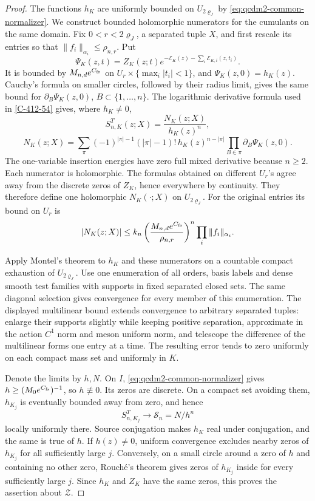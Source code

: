 \documentclass[11pt,letterpaper,reqno]{amsart}
\theoremstyle{definition}
\theoremstyle{remark}
\begin{document}
\begin{proof}
The functions \(h_K\) are uniformly bounded on \(U_{2\varrho_J}\)
by \eqref{eq:qcdm2-common-normalizer}. We construct bounded
holomorphic numerators for the cumulants on the same domain.
Fix \(0<r<2\varrho_J\), a separated tuple \(X\), and first
rescale its entries so that
\(\|f_i\|_{\alpha_i}\le\rho_{n,r}\).
Put
\[
 \Psi_K(z,t)=Z_K(z;t)
       e^{-\mathcal E_K(z)-\sum_i\mathcal E_{K,i}(z,t_i)}.
\]
It is bounded by \(M_{n,d}e^{C_{\rm fs}}\) on
\(U_r\times\{\max_i|t_i|<1\}\), and
\(\Psi_K(z,0)=h_K(z)\).
Cauchy's formula on smaller circles, followed by their radius
limit, gives the same bound for
\(\partial_B\Psi_K(z,0)\), \(B\subset\{1,\ldots,n\}\).
The logarithmic derivative formula used in
\cref{C-412-54} gives, where \(h_K\ne0\),
\[
 S^T_{n,K}(z;X)=\frac{N_K(z;X)}{h_K(z)^n},
\]
\[
 N_K(z;X)=
 \sum_\pi(-1)^{|\pi|-1}(|\pi|-1)!\,
 h_K(z)^{n-|\pi|}
             \prod_{B\in\pi}\partial_B\Psi_K(z,0).
\]
The one-variable insertion energies have zero full mixed
derivative because \(n\ge2\).
Each numerator is holomorphic. The formulas obtained on
different \(U_r\)'s agree away from the discrete zeros of
\(Z_K\), hence everywhere by continuity. They therefore
define one holomorphic \(N_K(\cdot;X)\) on \(U_{2\varrho_J}\).
For the original entries its bound on \(U_r\) is
\[
 |N_K(z;X)|\le
 k_n\left(\frac{M_{n,d}e^{C_{\rm fs}}}{\rho_{n,r}}\right)^n
                     \prod_i\|f_i\|_{\alpha_i}.
\]

Apply Montel's theorem to \(h_K\) and these numerators on a
countable compact exhaustion of \(U_{2\varrho_J}\).
Use one enumeration of all orders, basis labels and dense
smooth test families with supports in fixed separated closed
sets. The same diagonal selection gives convergence for
every member of this enumeration. The displayed multilinear
bound extends convergence to arbitrary separated tuples:
enlarge their supports slightly while keeping positive
separation, approximate in the action \(C^1\) norm and meson
uniform norm, and telescope the difference of the multilinear
forms one entry at a time. The resulting error tends to zero
uniformly on each compact mass set and uniformly in \(K\).

Denote the limits by \(h,N\).
On \(I\), \eqref{eq:qcdm2-common-normalizer} gives
\(h\ge(M_0e^{C_{\rm fs}})^{-1}\), so \(h\not\equiv0\).
Its zeros are discrete. On a compact set avoiding them,
\(h_{K_j}\) is eventually bounded away from zero, and hence
\[
 S^T_{n,K_j}\longrightarrow \mathcal S_n=N/h^n
\]
locally uniformly there. Source conjugation makes \(h_K\)
real under conjugation, and the same is true of \(h\).
If \(h(z)\ne0\), uniform convergence excludes nearby zeros
of \(h_{K_j}\) for all sufficiently large \(j\).
Conversely, on a small circle around a zero of \(h\) and
containing no other zero, Rouch\'e's theorem gives zeros of
\(h_{K_j}\) inside for every sufficiently large \(j\).
Since \(h_K\) and \(Z_K\) have the same zeros, this proves
the assertion about \(\mathcal Z\).


\end{proof}
\end{document}
